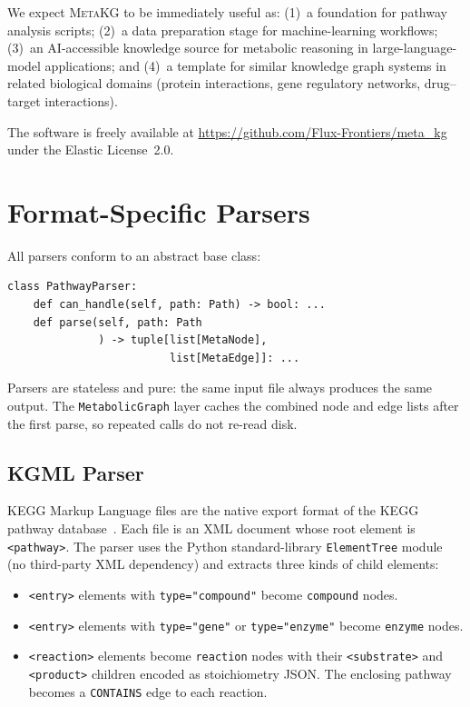 \documentclass[10pt]{article}
\begin{document}
We expect \textsc{MetaKG} to be immediately useful as: (1)~a foundation for
pathway analysis scripts; (2)~a data preparation stage for machine-learning
workflows; (3)~an AI-accessible knowledge source for metabolic reasoning in
large-language-model applications; and (4)~a template for similar knowledge
graph systems in related biological domains (protein interactions, gene
regulatory networks, drug--target interactions).

The software is freely available at
\url{https://github.com/Flux-Frontiers/meta_kg} under the Elastic License~2.0.

\appendix

\section{Format-Specific Parsers}
\label{sec:parsers-detail}

All parsers conform to an abstract base class:

\begin{lstlisting}[style=python]
class PathwayParser:
    def can_handle(self, path: Path) -> bool: ...
    def parse(self, path: Path
              ) -> tuple[list[MetaNode],
                         list[MetaEdge]]: ...
\end{lstlisting}

Parsers are stateless and pure: the same input file always produces the same
output. The \texttt{MetabolicGraph} layer caches the combined node and edge
lists after the first parse, so repeated calls do not re-read disk.

\subsection{KGML Parser}

KEGG Markup Language files are the native export format of the KEGG pathway
database~\citep{kanehisa2021kegg}. Each file is an XML document whose root
element is \texttt{<pathway>}. The parser uses the Python standard-library
\texttt{ElementTree} module (no third-party XML dependency) and extracts three
kinds of child elements:

\begin{itemize}[leftmargin=*,itemsep=2pt]
  \item \texttt{<entry>} elements with \texttt{type="compound"} become
    \texttt{compound} nodes.
  \item \texttt{<entry>} elements with \texttt{type="gene"} or
    \texttt{type="enzyme"} become \texttt{enzyme} nodes.
  \item \texttt{<reaction>} elements become \texttt{reaction} nodes with
    their \texttt{<substrate>} and \texttt{<product>} children encoded as
    stoichiometry JSON. The enclosing pathway becomes a \texttt{CONTAINS}
    edge to each reaction.
\end{itemize}
\end{document}
